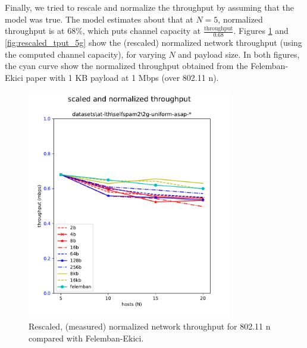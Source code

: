 Finally, we tried to rescale and normalize the throughput by assuming that the
model was true. The model estimates about that at $N = 5$, normalized
throughput is at $68\%$, which puts channel capacity at
$\frac{\text{throughput}}{0.68}$. Figures \ref{fig:rescaled_tput_2g} and
\ref{fig:rescaled_tput_5g} show the (rescaled) normalized network throughput
(using the computed channel capacity), for varying $N$ and payload size. In
both figures, the cyan curve show the normalized throughput obtained from the
Felemban-Ekici paper with 1 KB payload at 1 Mbps (over 802.11 n).

\begin{figure}[tbp]
  \centering
  \includegraphics[width=0.8\textwidth]{images/rescaled_u_2g.pdf}
  \caption{Rescaled, (measured) normalized network throughput for 802.11 n compared with Felemban-Ekici.}
  \label{fig:rescaled_tput_2g}
\end{figure}

